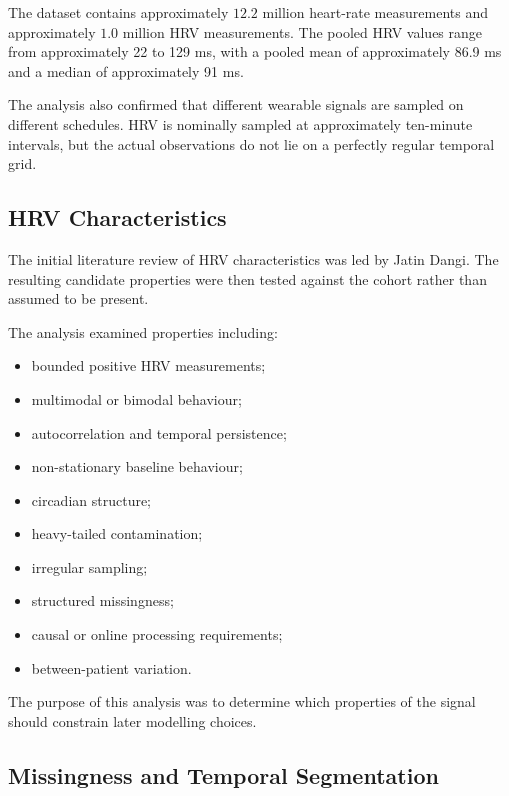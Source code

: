 \documentclass[11pt,a4paper]{article}
\begin{document}
The dataset contains approximately $12.2$ million heart-rate measurements and
approximately $1.0$ million HRV measurements. The pooled HRV values range from
approximately 22 to 129 ms, with a pooled mean of approximately 86.9 ms and a
median of approximately 91 ms.

The analysis also confirmed that different wearable signals are sampled on
different schedules. HRV is nominally sampled at approximately ten-minute
intervals, but the actual observations do not lie on a perfectly regular
temporal grid.

\subsection{HRV Characteristics}

The initial literature review of HRV characteristics was led by Jatin Dangi.
The resulting candidate properties were then tested against the cohort rather
than assumed to be present.

The analysis examined properties including:

\begin{itemize}[leftmargin=1.5em]
    \item bounded positive HRV measurements;
    \item multimodal or bimodal behaviour;
    \item autocorrelation and temporal persistence;
    \item non-stationary baseline behaviour;
    \item circadian structure;
    \item heavy-tailed contamination;
    \item irregular sampling;
    \item structured missingness;
    \item causal or online processing requirements;
    \item between-patient variation.
\end{itemize}

The purpose of this analysis was to determine which properties of the signal
should constrain later modelling choices.

\subsection{Missingness and Temporal Segmentation}
\end{document}
